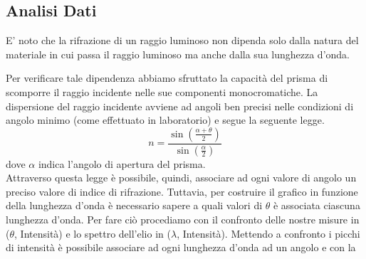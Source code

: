 \documentclass[letterpaper,11pt]{article}
\begin{document}
\begin{body}
\section{Analisi Dati} 
\raggedcolumns
E' noto che la rifrazione di un raggio luminoso non dipenda solo dalla natura del materiale in cui passa il raggio luminoso ma anche dalla sua lunghezza d'onda.
\begin{figurehere}
\end{figurehere}
 Per verificare tale dipendenza abbiamo sfruttato la capacità del prisma di scomporre il raggio incidente nelle sue componenti monocromatiche. La dispersione del raggio incidente avviene ad angoli ben precisi nelle condizioni di angolo minimo (come effettuato in laboratorio) e segue la seguente legge.
\begin{equation}
n = \frac{\sin(\frac{\alpha  + \theta}{2})}{\sin(\frac{\alpha}{2})}
\end{equation} 
dove $\alpha$ indica l'angolo di apertura del prisma. \\
Attraverso questa legge è possibile, quindi, associare ad ogni valore di angolo un preciso valore di indice di rifrazione. Tuttavia, per  costruire il grafico in funzione della lunghezza d'onda è necessario sapere a quali valori di $\theta$ è associata ciascuna lunghezza d'onda. Per fare ciò procediamo con il confronto delle nostre misure in ($\theta$, Intensità) e lo spettro dell'elio in ($\lambda$, Intensità). Mettendo a confronto i picchi di intensità è possibile associare ad ogni lunghezza d'onda ad un angolo e con la 

\end{body}
\end{document}
